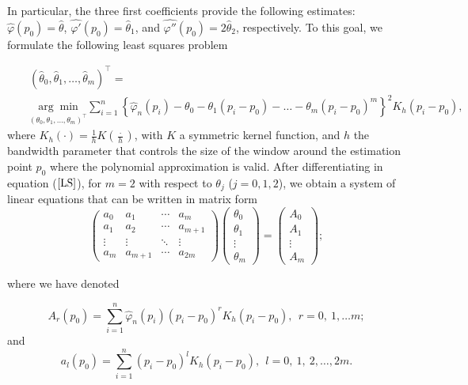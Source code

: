\documentclass[preprint,12pt]{elsarticle}
\begin{document}
In particular, the three first coefficients provide the following estimates: $\widehat{\varphi}(p_0)=\widehat{\theta}$, $\widehat{\varphi'}(p_0)=\widehat{\theta}_1$, and $\widehat{\varphi''}(p_0)=2\widehat{\theta}_2$, respectively.
To this goal, we formulate the following least squares problem

\begin{eqnarray}\label{LS}
&&\left(\widehat{\theta}_0,\widehat{\theta}_1,\ldots,\widehat{\theta}_m\right)^{\intercal}= \\
\nonumber &&\underset{\left({\theta}_0,\theta_1,\ldots, {\theta}_m\right)^{\intercal}}{\arg \min} \sum_{i=1}^n\left\{\widehat{\varphi}_n(p_i)-\theta_0-\theta_1(p_i-p_0)-\ldots-\theta_m(p_i-p_0)^m\right\}^2 K_h(p_i-p_0),
\end{eqnarray}
where $K_h(\cdot)=\frac{1}{h}K(\frac{\cdot}{h})$, with $K$ a symmetric kernel function, and $h$ the bandwidth parameter that controls the size of the window around the estimation point $p_0$ where the polynomial approximation is valid.
After differentiating in equation ($\ref{LS}$), for $m=2$ with respect to $\theta_j$ ($j=0, 1, 2$), we obtain a system of linear equations that can be written in matrix form
\[
\left(\begin{array}{cccc}
a_0 & a_1&\cdots &a_m \\ 
a_{1} & a_2&\cdots &a_{m+1}\\
\vdots & \vdots &\ddots &\vdots \\ 
a_m & a_{m+1}&\cdots &a_{2 m} 
\end{array}\right)
\left(\begin{array}{c}
 \theta_0 \\ 
\theta_1 \\ 
\vdots \\
\theta_m
 \end{array}\right)=
\left(\begin{array}{c} 
A_0 \\ 
A_1 \\ 
\vdots \\
A_m
 \end{array}\right);
\]

where we have denoted

\[
A_r(p_0)=\sum_{i=1}^n\widehat{\varphi}_n(p_i)(p_i-p_0)^r K_h(p_i-p_0), \ \ r=0, \ 1,\ldots  m;
\]
and 
\[
a_l(p_0)=\sum_{i=1}^n(p_i-p_0)^l K_h(p_i-p_0), \ \ l=0,\ 1, \ 2, \ldots, 2m.
\]
\end{document}
